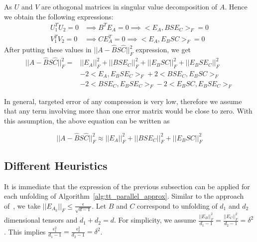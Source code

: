 \documentclass[runningheads]{llncs}
\begin{document}
\noindent As $U$ and $V$ are othogonal matrices in singular value decomposition of $A$. Hence we obtain the following expressions:
\begin{align*}
U_1^TU_2 = 0 & \implies B^TE_A = 0 \implies <E_A, BSE_C>_F = 0\\
V_1^TV_2 = 0 & \implies CE_A^T = 0 \implies <E_A, E_BSC>_F = 0  
\end{align*}
After putting these values in $||A - \hat{B}S\hat{C}||_F^2$ expression, we get
\begin{align*}
||A - \hat{B} S \hat{C}||_F^2 =& ||E_A||_F^2 + ||BSE_C||_F^2 + ||E_BSC||_F^2 + ||E_BSE_C||_F^2 \\
& -2 <E_A, E_BSE_C>_F  + 2 <BSE_C, E_BSC>_F\\
& -2 <BSE_C, E_BSE_C>_F - 2<E_BSC, E_BSE_C>_F
\end{align*}

\noindent In general, targeted error of any compression is very low, therefore we assume that any term involving more than one error matrix would be close to zero. With this assumption, the above equation can be written as

\begin{equation*}
||A - \hat{B} S \hat{C}||_F^2 \approx ||E_A||_F^2 + ||BSE_C||_F^2 + ||E_BSC||_F^2
\end{equation*}

\subsection{Different Heuristics}
\label{sec:heuristics:all}

It is immediate that the expression of the previous subsection can be applied for each unfolding of Algorithm~\ref{alg:tt_parallel_approx}. Similar to the approach of~\cite{tt}, we take $||E_{A_k}||_F \le \frac{\epsilon}{\sqrt{d-1}}$. Let $B$ and $C$ correspond to unfolding of $d_1$ and $d_2$ dimensional tensors and $d_1 + d_2 = d$. For simplicity, we  assume $\frac{||E_B||_F^2}{d_1-1} = \frac{||E_C||_F^2}{d_2-1} = \delta^2$. This implies $\frac{\epsilon_1^2}{d_1-1} = \frac{\epsilon_2^2}{d_2-1} = \delta^2$.
\end{document}
